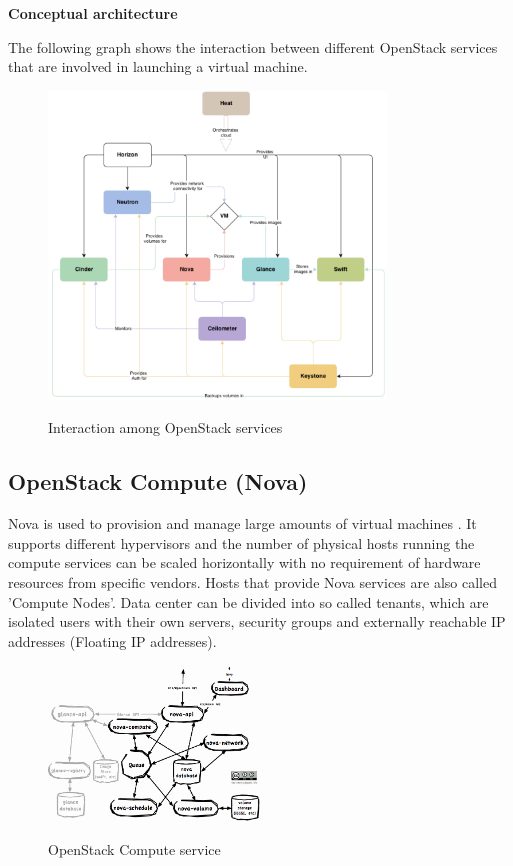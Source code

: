 \textbf{Conceptual architecture}

The following graph shows the interaction between different OpenStack services that are involved in launching a virtual machine.

\begin{figure}[H]
\centering
\includegraphics[width=0.8\textwidth]{images/fundamentals/openstack_conceptual_arch.png}
\caption{Interaction among OpenStack services}\cite{openstack-installjuno}
\end{figure}


\subsection{OpenStack Compute (Nova)}

Nova is used to provision and manage large amounts of virtual machines . It supports different hypervisors and the number of physical hosts running the compute services can be scaled horizontally with no requirement of hardware resources from specific vendors. Hosts that provide Nova services are also called 'Compute Nodes'. Data center can be divided into so called tenants, which are isolated users with their own servers, security groups and externally reachable IP addresses (Floating IP addresses). 

\begin{figure}[H]
\centering
\includegraphics[width=0.5\textwidth]{images/fundamentals/openstack_nova.png}
\caption{OpenStack Compute service} \cite{nova-arch}
\end{figure}

